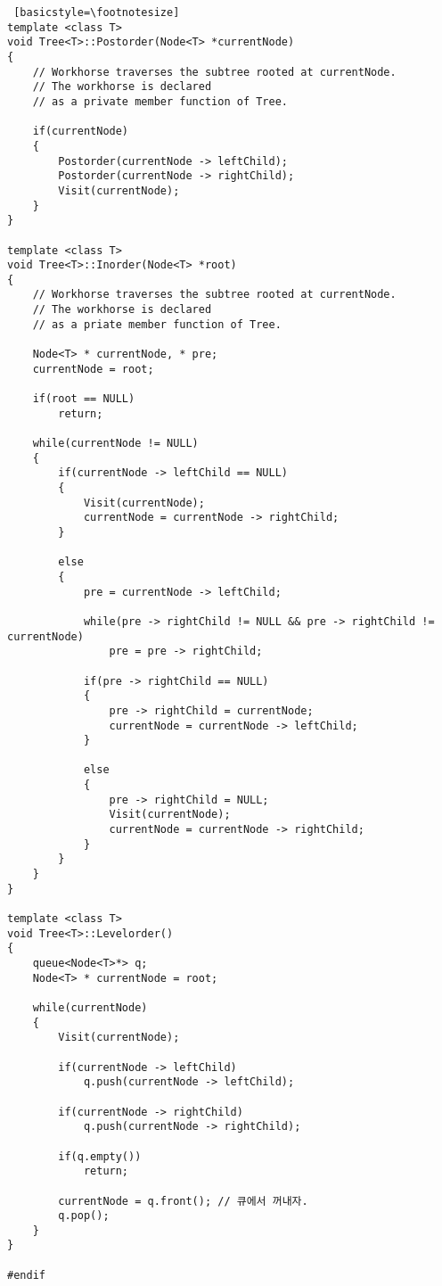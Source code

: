 \documentclass[twoside,twocolumn]{article}
\begin{document}
\begin{lstlisting} [basicstyle=\footnotesize]
template <class T>
void Tree<T>::Postorder(Node<T> *currentNode)
{
	// Workhorse traverses the subtree rooted at currentNode.
	// The workhorse is declared
	// as a private member function of Tree.

	if(currentNode)
	{
		Postorder(currentNode -> leftChild);
		Postorder(currentNode -> rightChild);
		Visit(currentNode);
	}
}

template <class T>
void Tree<T>::Inorder(Node<T> *root)
{
	// Workhorse traverses the subtree rooted at currentNode.
	// The workhorse is declared
	// as a priate member function of Tree.

	Node<T> * currentNode, * pre;
	currentNode = root;

	if(root == NULL)
		return;

	while(currentNode != NULL)
	{
		if(currentNode -> leftChild == NULL)
		{
			Visit(currentNode);
			currentNode = currentNode -> rightChild;
		}

		else
		{
			pre = currentNode -> leftChild;

			while(pre -> rightChild != NULL && pre -> rightChild != currentNode)
				pre = pre -> rightChild;

			if(pre -> rightChild == NULL)
			{
				pre -> rightChild = currentNode;
				currentNode = currentNode -> leftChild;
			}

			else
			{
				pre -> rightChild = NULL;
				Visit(currentNode);
				currentNode = currentNode -> rightChild;
			}
		}
	}
}

template <class T>
void Tree<T>::Levelorder()
{
	queue<Node<T>*> q;
	Node<T> * currentNode = root;

	while(currentNode)
	{
		Visit(currentNode);

		if(currentNode -> leftChild)
			q.push(currentNode -> leftChild);

		if(currentNode -> rightChild)
			q.push(currentNode -> rightChild);

		if(q.empty())
			return;

		currentNode = q.front(); // 큐에서 꺼내자.
		q.pop();
	}
}

#endif
\end{lstlisting}
\end{document}
